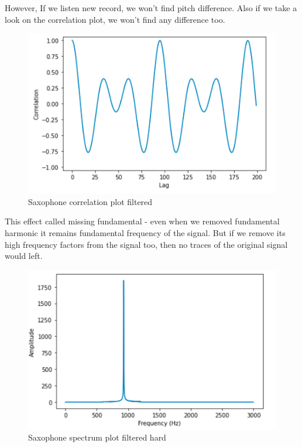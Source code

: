 \documentclass[a4paper]{article}
\begin{document}
            However, If we listen new record, we won't find pitch difference.
            Also if we take a look on the correlation plot, we won't find any difference too.
            
            \begin{figure}[H]
                \centering
                \includegraphics[width=\textwidth]{img/sac_corr_2.png}
                \caption{Saxophone correlation plot filtered}
                \label{fig:part42}
            \end{figure}
            
            This effect called missing fundamental - even when we removed fundamental harmonic it remains fundamental frequency of the signal. But if we remove its high frequency factors from the signal too, then no traces of the original signal would left.
            
            \begin{figure}[H]
                \centering
                \includegraphics[width=\textwidth]{img/sac_filtered_hard.png}
                \caption{Saxophone spectrum plot filtered hard}
                \label{fig:part42}
            \end{figure}
            
\end{document}
